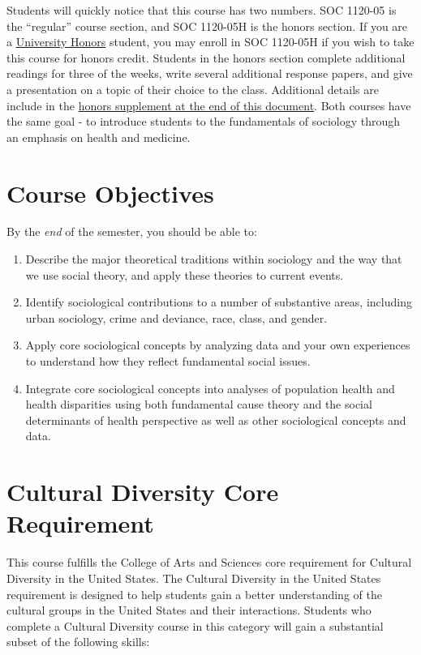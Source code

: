\documentclass[
]{book}
\providecommand{\tightlist}{%
  \setlength{\itemsep}{0pt}\setlength{\parskip}{0pt}}
\begin{document}
Students will quickly notice that this course has two numbers. SOC 1120-05 is the ``regular'' course section, and SOC 1120-05H is the honors section. If you are a \href{https://www.slu.edu/honors/index.php}{University Honors} student, you may enroll in SOC 1120-05H if you wish to take this course for honors credit. Students in the honors section complete additional readings for three of the weeks, write several additional response papers, and give a presentation on a topic of their choice to the class. Additional details are include in the \href{/syllabus/honors-overview.html}{honors supplement at the end of this document}. Both courses have the same goal - to introduce students to the fundamentals of sociology through an emphasis on health and medicine.

\hypertarget{course-objectives}{%
\section{Course Objectives}\label{course-objectives}}

By the \emph{end} of the semester, you should be able to:

\begin{enumerate}
\def\labelenumi{\arabic{enumi}.}
\tightlist
\item
  Describe the major theoretical traditions within sociology and the way that we use social theory, and apply these theories to current events.
\item
  Identify sociological contributions to a number of substantive areas, including urban sociology, crime and deviance, race, class, and gender.
\item
  Apply core sociological concepts by analyzing data and your own experiences to understand how they reflect fundamental social issues.
\item
  Integrate core sociological concepts into analyses of population health and health disparities using both fundamental cause theory and the social determinants of health perspective as well as other sociological concepts and data.
\end{enumerate}

\hypertarget{cultural-diversity-core-requirement}{%
\section{Cultural Diversity Core Requirement}\label{cultural-diversity-core-requirement}}

This course fulfills the College of Arts and Sciences core requirement for Cultural Diversity in the United States. The Cultural Diversity in the United States requirement is designed to help students gain a better understanding of the cultural groups in the United States and their interactions. Students who complete a Cultural Diversity course in this category will gain a substantial subset of the following skills:
\end{document}
